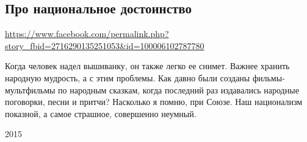 
 
 
 
 

\subsection{Про национальное достоинство}
\url{https://www.facebook.com/permalink.php?story_fbid=2716290135251053&id=100006102787780}

Когда человек надел вышиванку, он также легко ее снимет. Важнее хранить
народную мудрость, а с этим проблемы. Как давно были созданы фильмы-мультфильмы
по народным сказкам, когда последний раз издавались народные поговорки, песни и
притчи? Насколько я помню, при Союзе. Наш национализм показной, а самое
страшное, совершенно неумный.

2015
